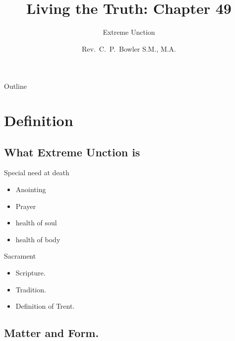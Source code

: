 \documentclass{beamer}
\title[Living the Truth 49] %
{Living the Truth: Chapter 49}
\subtitle
{Extreme Unction} %
\author{Rev.~C.~P.~Bowler S.M., M.A.}
\begin{document}
\begin{frame}
  \titlepage
\end{frame}

\begin{frame}{Outline}
  \tableofcontents
\end{frame}




\section{Definition}

\subsection{What Extreme Unction is}

\begin{frame}{Special need at death}
\begin{itemize}
\item Anointing
\item Prayer
\item health of soul
\item health of body
\end{itemize}
\end{frame}

\begin{frame}{Sacrament}
\begin{itemize}
 \item Scripture.
 \item Tradition.
 \item Definition of Trent.
\end{itemize}
\end{frame}

\subsection{Matter and Form.}
\end{document}
